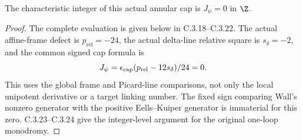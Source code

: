 \begin{corollary}
The characteristic integer of this actual annular cap is
$J_\psi=0$ in $\Z$.
\end{corollary}
\begin{proof}
The complete evaluation is given below in C.3.18--C.3.22.
The actual affine-frame defect is $p_{\mathrm{rel}}=-24$,
the actual delta-line relative square is $s_\delta=-2$, and
the common signed cap formula is
\[
 J_\psi=\epsilon_{\rm cap}
              (p_{\mathrm{rel}}-12s_\delta)/24=0.
\]
This uses the global frame and Picard-line comparisons, not
only the local unipotent derivative or a target linking number.
The fixed sign comparing Wall's nonzero generator with the
positive Eells--Kuiper generator is immaterial for this zero.
C.3.23--C.3.24 give the integer-level argument for the original
one-loop monodromy.
\end{proof}

